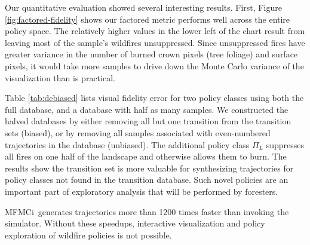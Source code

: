 \documentclass{article}
\newcommand{\algname}{MFMCi}
\begin{document}
Our quantitative evaluation showed several interesting results. First,
Figure \ref{fig:factored-fidelity} shows our factored metric performs well
across the entire policy space. The relatively higher values in the lower
left of the chart result from leaving most of the sample's wildfires unsuppressed. Since
unsuppressed fires have greater variance in the number of burned
crown pixels (tree foliage) and surface pixels,
it would take more samples to drive down
the Monte Carlo variance of the visualization than is practical.

Table \ref{tab:debiased} lists visual fidelity error for two policy classes using
both the full database, and a database with half as many samples.
We constructed the halved databases
by either removing all but one transition from the transition sets (biased),
or by removing all samples associated with even-numbered
trajectories in the database (unbiased). The additional policy class $\Pi_{L}$
suppresses all fires on one half of the landscape and otherwise
allows them to burn.
The results show the transition set is more valuable
for synthesizing trajectories for policy classes not found in the transition database.
Such novel policies are an important part of exploratory analysis that
will be performed by foresters.

\algname\ generates trajectories more than 1200 times faster
than invoking the simulator.
Without these speedups, interactive visualization and
policy exploration of wildfire policies is not possible.

\small



\end{document}
